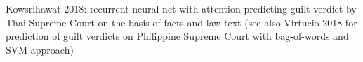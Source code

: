 \documentclass[11pt,a4paper]{article}
\begin{document}
Kowsrihawat 2018: recurrent neural net with attention predicting guilt verdict by Thai Supreme Court on the basis of facts and law text (see also Virtucio 2018 for prediction of guilt verdicts on Philippine Supreme Court with bag-of-words and SVM approach)




\end{document}
